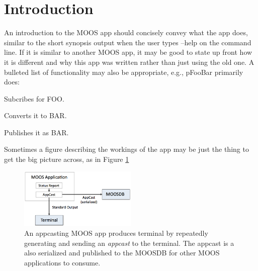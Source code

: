 \section{Introduction}
\label{sec_pfoobar_intro}

An introduction to the MOOS app should concisely convey what the app does, 
similar to the short synopsis output when the user types --help on the 
command line. If it is similar to another MOOS app, it may be good to 
state up front how it is different and why this app was written rather
than just using the old one. A bulleted list of functionality may also
be appropriate, e.g., pFooBar primarily does:

\begin{packed_itemize}

\item Subcribes for FOO.

\item Converts it to BAR.

\item Publishes it as BAR.

\end{packed_itemize}
\vspace{0.05in}

Sometimes a figure describing the workings of the app may be just the thing
to get the big picture across, as in Figure \ref{big_picture}

\begin{figure}[H]
  \begin{minipage}[b]{0.99\textwidth}
    \centering 
    \includegraphics[width=0.5\textwidth]{figures/moos_withappcast.png}
  \end{minipage}
  \caption{An appcasting MOOS app produces terminal by repeatedly
    generating and sending an {\em appcast} to the terminal. The
    appcast is a also serialized and published to the MOOSDB for other
    MOOS applications to consume.}
\label{big_picture}
\end{figure}
\vspace{0.05in}

